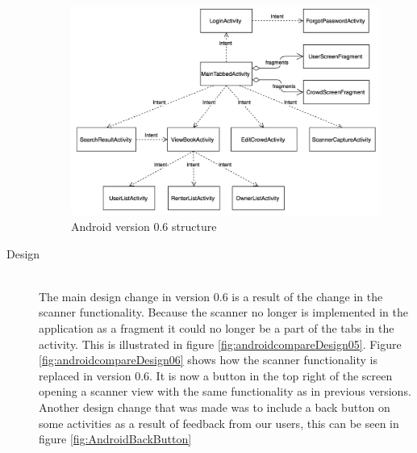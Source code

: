 \begin{description}
\begin{figure}
\centering
\includegraphics[width=\textwidth]{figs/v06/Android/AndroidStructure-06.png}
\caption{Android version 0.6 structure}
\label{fig:AndroidStructure-06}
\end{figure}

    \item[Design] \hfill\\
The main design change in version 0.6 is a result of the change in the scanner functionality. Because the scanner no longer is implemented in the application as a fragment it could no longer be a part of the tabs in the  activity. This is illustrated in figure \ref{fig:androidcompareDesign05}. Figure \ref{fig:androidcompareDesign06} shows how the scanner functionality is replaced in version 0.6. It is now a button in the top right of the screen opening a scanner view with the same functionality as in previous versions. Another design change that was made was to include a back button on some activities as a result of feedback from our users, this can be seen in figure \ref{fig:AndroidBackButton}


\end{description}
